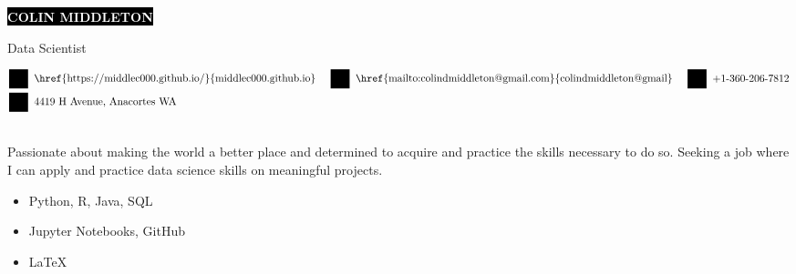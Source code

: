 \documentclass[11pt]{developercv} %
\begin{document}
\setlength{\abovedisplayskip}{0pt}
\setlength{\belowdisplayskip}{0pt}

\colorbox{black}{{\HUGE\textcolor{white}{\textbf{\MakeUppercase{Colin Middleton}}}}}

\vspace{6pt}

{\huge Data Scientist} %

\vspace{0.25cm}

\begin{align*}
	\centering
	&\icon{Globe}{12}{\href{https://middlec000.github.io/}{middlec000.github.io}}
	\hspace{0.5cm}
	\icon{At}{12}{\href{mailto:colindmiddleton@gmail.com}{colindmiddleton@gmail}}
	\hspace{0.5cm}
	\icon{Phone}{12}{+1-360-206-7812}
	\\
	&\icon{MapMarker}{12}{4419 H Avenue, Anacortes WA}	
\end{align*}

\vspace{0.25cm}


\begin{minipage}[t]{0.5\textwidth} %
	 \\
	Passionate about making the world a better place and determined to acquire and practice the skills necessary to do so. Seeking a job where I can apply and practice data science skills on meaningful projects. 
\end{minipage}
\hfill %
\begin{minipage}[t]{0.4\textwidth}
	\begin{itemize}
		\item Python, R, Java, SQL
		\item Jupyter Notebooks, GitHub
	   	\item LaTeX
	\end{itemize}
\end{minipage}
\end{document}
